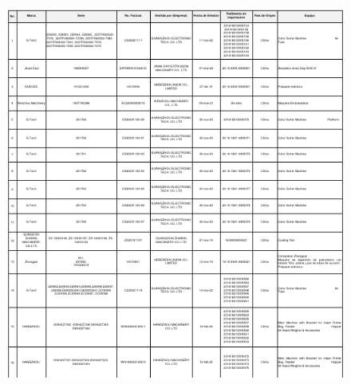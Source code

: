 \begin{figure}[hbtp!]
	\centering
	\includegraphics[width=  \linewidth, page = 29]{../0.imagenes/CAP_13/cap_13}
\end{figure}


